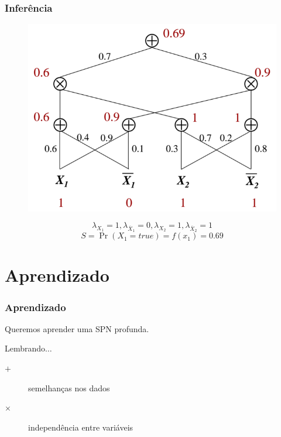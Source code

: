 \documentclass[10pt]{beamer}
\theoremstyle{plain}
\begin{document}
\begin{frame}
  \frametitle{Inferência}

  \begin{figure}[h]
    \centering\includegraphics[scale=0.25]{imgs/marginals.png}
  \end{figure}
  \begin{equation*}
    \lambda_{X_1}=1,\lambda_{\overline{X}_1}=0,\lambda_{X_2}=1,\lambda_{\overline{X}_2}=1
  \end{equation*}
  \begin{equation*}
    S=\Pr(X_1=true)=f(x_1)=0.69
  \end{equation*}
\end{frame}


\section{Aprendizado}

\begin{frame}
  \frametitle{Aprendizado}
  Queremos aprender uma SPN profunda.

  Lembrando$\ldots$

  \begin{description}
    \item[$+$] semelhanças nos dados
    \item[$\times$] independência entre variáveis
  \end{description}
\end{frame}
\end{document}
